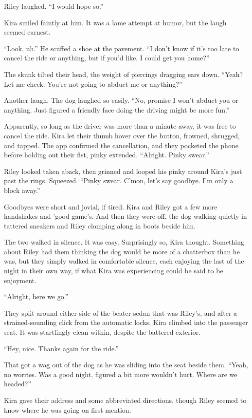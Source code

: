 Riley laughed. ``I would hope so.''

Kira smiled faintly at him. It was a lame attempt at humor, but the laugh seemed earnest.

``Look, uh.'' He scuffed a shoe at the pavement. ``I don't know if it's too late to cancel the ride or anything, but if you'd like, I could get you home?''

The skunk tilted their head, the weight of piercings dragging ears down. ``Yeah? Let me check. You're not going to abduct me or anything?''

Another laugh. The dog laughed so easily. ``No, promise I won't abduct you or anything. Just figured a friendly face doing the driving might be more fun.''

Apparently, so long as the driver was more than a minute away, it was free to cancel the ride. Kira let their thumb hover over the button, frowned, shrugged, and tapped. The app confirmed the cancellation, and they pocketed the phone before holding out their fist, pinky extended. ``Alright. Pinky swear.''

Riley looked taken aback, then grinned and looped his pinky around Kira's just past the rings. Squeezed. ``Pinky swear. C'mon, let's say goodbye. I'm only a block away.''

Goodbyes were short and jovial, if tired. Kira and Riley got a few more handshakes and 'good game's. And then they were off, the dog walking quietly in tattered sneakers and Riley clomping along in boots beside him.

The two walked in silence. It was easy. Surprisingly so, Kira thought. Something about Riley had them thinking the dog would be more of a chatterbox than he was, but they simply walked in comfortable silence, each enjoying the last of the night in their own way, if what Kira was experiencing could be said to be enjoyment.

``Alright, here we go.''

They split around either side of the beater sedan that was Riley's, and after a strained-sounding click from the automatic locks, Kira climbed into the passenger seat. It was startlingly clean within, despite the battered exterior.

``Hey, nice. Thanks again for the ride.''

That got a wag out of the dog as he was sliding into the seat beside them. ``Yeah, no worries. Was a good night, figured a bit more wouldn't hurt. Where are we headed?''

Kira gave their address and some abbreviated directions, though Riley seemed to know where he was going on first mention.

